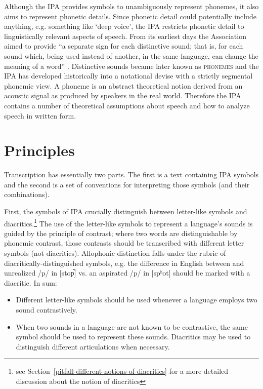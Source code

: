 Although the IPA provides symbols to unambiguously represent phonemes, it also
aims to represent phonetic details. Since phonetic detail could potentially
include anything, e.g. something like `deep voice', the IPA restricts phonetic
detail to linguistically relevant aspects of speech. From its earliest days the
Association aimed to provide ``a separate sign for each distinctive sound; that
is, for each sound which, being used instead of another, in the same language,
can change the meaning of a word'' \citep[27]{IPA1999}. Distinctive sounds
became later known as \textsc{phonemes} and the IPA has developed historically
into a notational devise with a strictly segmental phonemic view. A phoneme is
an abstract theoretical notion derived from an acoustic signal as produced by
speakers in the real world. Therefore the IPA contains a number of theoretical
assumptions about speech and how to analyze speech in written form. 

\section{Principles}
\label{IPAprinciples}

Transcription has essentially two parts. The first is a text containing IPA 
symbols and the second is a set of conventions for interpreting those 
symbols (and their combinations).

First, the symbols of IPA crucially distinguish between letter-like symbols and
diacritics.\footnote{see Section~\ref{pitfall-different-notions-of-diacritics} for a more
detailed discussion about the notion of diacritics} The use of the letter-like
symbols to represent a language's sounds is guided by the principle of contrast;
where two words are distinguishable by phonemic contrast, those contrasts should
be transcribed with different letter symbols (not diacritics). Allophonic
distinction falls under the rubric of diacritically-distinguished symbols, e.g.
the difference in English between and unrealized /p/ in [stop̚] vs. an aspirated
/p/ in [spʰot] should be marked with a diacritic. In sum:

\begin{itemize}

	\item Different letter-like symbols should be used whenever
          a language employs two sound contrastively.
	\item When two sounds in a language are not known to be contrastive, the same
          symbol should be used to represent these sounds. Diacritics may
          be used to distinguish different articulations when necessary.
\end{itemize}          
          
